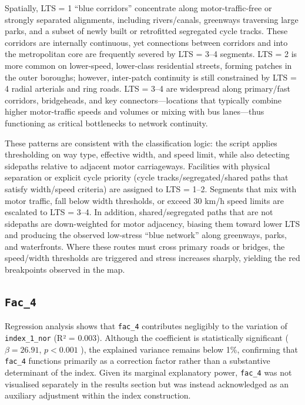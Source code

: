 \documentclass[
  12pt,
  oneside]{book}
\begin{document}
Spatially, LTS = 1 ``blue corridors'' concentrate along motor-traffic-free or strongly separated alignments, including rivers/canals, greenways traversing large parks, and a subset of newly built or retrofitted segregated cycle tracks. These corridors are internally continuous, yet connections between corridors and into the metropolitan core are frequently severed by LTS = 3--4 segments. LTS = 2 is more common on lower-speed, lower-class residential streets, forming patches in the outer boroughs; however, inter-patch continuity is still constrained by LTS = 4 radial arterials and ring roads. LTS = 3--4 are widespread along primary/fast corridors, bridgeheads, and key connectors---locations that typically combine higher motor-traffic speeds and volumes or mixing with bus lanes---thus functioning as critical bottlenecks to network continuity.

These patterns are consistent with the classification logic: the script applies thresholding on way type, effective width, and speed limit, while also detecting sidepaths relative to adjacent motor carriageways. Facilities with physical separation or explicit cycle priority (cycle tracks/segregated/shared paths that satisfy width/speed criteria) are assigned to LTS = 1--2. Segments that mix with motor traffic, fall below width thresholds, or exceed 30 km/h speed limits are escalated to LTS = 3--4. In addition, shared/segregated paths that are not sidepaths are down-weighted for motor adjacency, biasing them toward lower LTS and producing the observed low-stress ``blue network'' along greenways, parks, and waterfronts. Where these routes must cross primary roads or bridges, the speed/width thresholds are triggered and stress increases sharply, yielding the red breakpoints observed in the map.

\subsection{\texorpdfstring{\texttt{Fac\_4}}{Fac\_4}}\label{fac_4}

Regression analysis shows that \texttt{fac\_4} contributes negligibly to the variation of \texttt{index\_1\_nor} (R² = 0.003). Although the coefficient is statistically significant ( \(\beta = 26.91\), \(p < 0.001\) ), the explained variance remains below 1\%, confirming that \texttt{fac\_4} functions primarily as a correction factor rather than a substantive determinant of the index. Given its marginal explanatory power, \texttt{fac\_4} was not visualised separately in the results section but was instead acknowledged as an auxiliary adjustment within the index construction.
\end{document}
